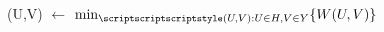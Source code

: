 \documentclass[preview]{standalone}
\begin{document}
\begin{center}
(U,V) $\leftarrow$  $\min_{\scriptscriptscriptstyle  (U,V): U \in H , V \in Y} \{ W(U,V) \} $
\end{center}
\end{document}
